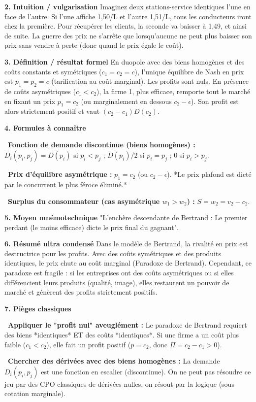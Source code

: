\documentclass[11pt, a4paper]{report}
\begin{document}
\textbf{2. Intuition / vulgarisation}
Imaginez deux stations-service identiques l'une en face de l'autre. Si l'une affiche 1,50\texteuro{}/L et l'autre 1,51\texteuro{}/L, tous les conducteurs iront chez la première. Pour récupérer les clients, la seconde va baisser à 1,49\texteuro{}, et ainsi de suite. La guerre des prix ne s'arrête que lorsqu'aucune ne peut plus baisser son prix sans vendre à perte (donc quand le prix égale le coût).

\textbf{3. Définition / résultat formel}
En duopole avec des biens homogènes et des coûts constants et symétriques ($c_1 = c_2 = c$), l'unique équilibre de Nash en prix est $p_1 = p_2 = c$ (tarification au coût marginal). Les profits sont nuls.
En présence de coûts asymétriques ($c_1 < c_2$), la firme 1, plus efficace, remporte tout le marché en fixant un prix $p_1 = c_2$ (ou marginalement en dessous $c_2 - \epsilon$). Son profit est alors strictement positif et vaut $(c_2 - c_1)D(c_2)$.

\textbf{4. Formules à connaître}
\par \textbullet\ \textbf{Fonction de demande discontinue (biens homogènes) :} $D_i(p_i, p_j) = D(p_i)$ si $p_i < p_j$ ; $D(p_i)/2$ si $p_i = p_j$ ; $0$ si $p_i > p_j$.
\par \textbullet\ \textbf{Prix d'équilibre asymétrique :} $p_1 = c_2$ (ou $c_2 - \epsilon$). *Le prix plafond est dicté par le concurrent le plus féroce éliminé.*
\par \textbullet\ \textbf{Surplus du consommateur (cas asymétrique $w_1 > w_2$) :} $S = w_2 = v_2 - c_2$.

\textbf{5. Moyen mnémotechnique}
"L'enchère descendante de Bertrand : Le premier perdant (le moins efficace) dicte le prix final du gagnant". 

\textbf{6. Résumé ultra condensé}
Dans le modèle de Bertrand, la rivalité en prix est destructrice pour les profits. Avec des coûts symétriques et des produits identiques, le prix chute au coût marginal (Paradoxe de Bertrand). Cependant, ce paradoxe est fragile : si les entreprises ont des coûts asymétriques ou si elles différencient leurs produits (qualité, image), elles restaurent un pouvoir de marché et génèrent des profits strictement positifs.

\textbf{7. Pièges classiques}
\par \textbullet\ \textbf{Appliquer le "profit nul" aveuglément :} Le paradoxe de Bertrand requiert des biens *identiques* ET des coûts *identiques*. Si une firme a un coût plus faible ($c_1 < c_2$), elle fait un profit positif ($p=c_2$, donc $\Pi = c_2-c_1 > 0$).
\par \textbullet\ \textbf{Chercher des dérivées avec des biens homogènes :} La demande $D_i(p_i, p_j)$ est une fonction en escalier (discontinue). On ne peut pas résoudre ce jeu par des CPO classiques de dérivées nulles, on résout par la logique (sous-cotation marginale).
\end{document}
